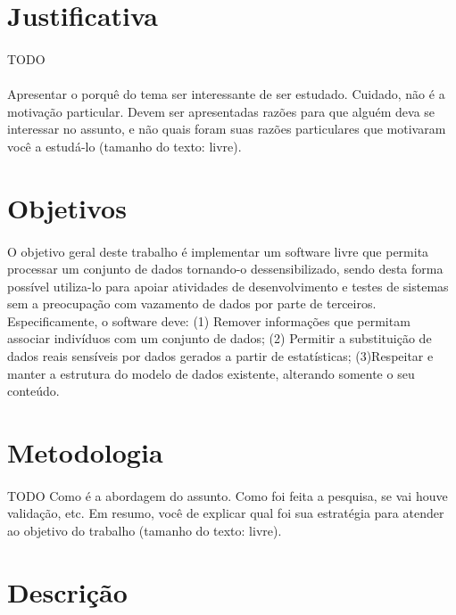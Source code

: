\section{Justificativa}

\paragraph{} TODO
\paragraph{}Apresentar o porquê do tema ser interessante de ser estudado. Cuidado, não é a motivação particular. Devem ser apresentadas razões para que alguém deva se interessar no assunto, e não quais foram suas razões particulares que motivaram você a estudá-lo (tamanho do texto: livre).


\section{Objetivos}

\paragraph{} O objetivo geral deste trabalho é implementar um software livre que permita processar um conjunto de dados tornando-o dessensibilizado, sendo desta forma possível utiliza-lo para apoiar atividades de desenvolvimento e testes de sistemas sem a preocupação com vazamento de dados por parte de terceiros.
Especificamente, o software deve: (1) Remover informações que permitam associar indivíduos com um conjunto de dados; (2) Permitir a substituição de dados reais sensíveis por dados gerados a partir de estatísticas; (3)Respeitar e manter a estrutura do modelo de dados existente, alterando somente o seu conteúdo.


\section{Metodologia}

\paragraph{} TODO Como é a abordagem do assunto. Como foi feita a pesquisa, se vai houve validação, etc. Em resumo, você de explicar qual foi sua estratégia para atender ao objetivo do trabalho (tamanho do texto: livre).


\section{Descrição}

